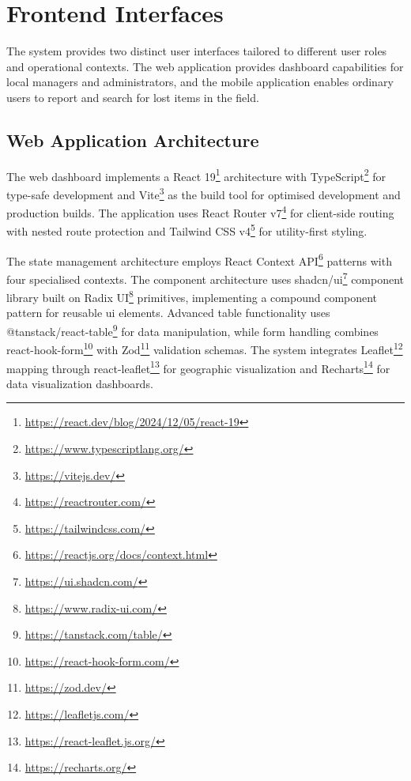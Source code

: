 

\section{Frontend Interfaces} \label{section:frontend_interfaces}

The system provides two distinct user interfaces tailored to different user roles and operational contexts. The web application provides dashboard capabilities for local managers and administrators, and the mobile application enables ordinary users to report and search for lost items in the field.

\subsection{Web Application Architecture} \label{subsection:web_application}

The web dashboard implements a React 19\footnote{\url{https://react.dev/blog/2024/12/05/react-19}} architecture with TypeScript\footnote{\url{https://www.typescriptlang.org/}} for type-safe development and Vite\footnote{\url{https://vitejs.dev/}} as the build tool for optimised development and production builds. The application uses React Router v7\footnote{\url{https://reactrouter.com/}} for client-side routing with nested route protection and Tailwind CSS v4\footnote{\url{https://tailwindcss.com/}} for utility-first styling.

The state management architecture employs React Context API\footnote{\url{https://reactjs.org/docs/context.html}} patterns with four specialised contexts. The component architecture uses shadcn/ui\footnote{\url{https://ui.shadcn.com/}} component library built on Radix UI\footnote{\url{https://www.radix-ui.com/}} primitives, implementing a compound component pattern for reusable \ac{ui} elements. Advanced table functionality uses @tanstack/react-table\footnote{\url{https://tanstack.com/table/}} for data manipulation, while form handling combines react-hook-form\footnote{\url{https://react-hook-form.com/}} with Zod\footnote{\url{https://zod.dev/}} validation schemas. The system integrates Leaflet\footnote{\url{https://leafletjs.com/}} mapping through react-leaflet\footnote{\url{https://react-leaflet.js.org/}} for geographic visualization and Recharts\footnote{\url{https://recharts.org/}} for data visualization dashboards.

